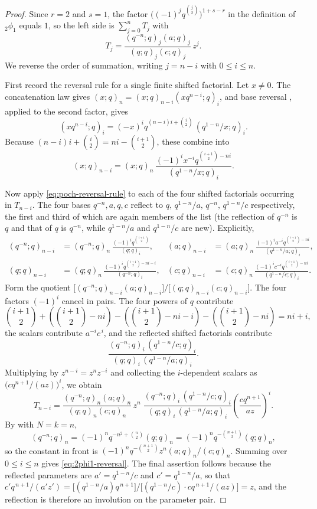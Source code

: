 \documentclass[11pt,a4paper,oneside,openany]{book}
\theoremstyle{definition}
\theoremstyle{remark}
\begin{document}
\begin{proof}
Since $r=2$ and $s=1$, the factor $\bigl((-1)^jq^{\binom j2}\bigr)^{1+s-r}$ in the definition of ${}_2\phi_1$ equals $1$, so the left side is $\sum_{j=0}^{n}T_j$ with
\[
 T_j=\frac{(q^{-n};q)_j(a;q)_j}{(q;q)_j(c;q)_j}\,z^{j}.
\]
We reverse the order of summation, writing $j=n-i$ with $0\le i\le n$.

First record the reversal rule for a single finite shifted factorial.  Let $x\ne0$.  The concatenation law  gives $(x;q)_n=(x;q)_{n-i}(xq^{n-i};q)_i$, and base reversal , applied to the second factor, gives
\[
 (xq^{n-i};q)_i=(-x)^iq^{(n-i)i+\binom i2}\,(q^{1-n}/x;q)_i .
\]
Because $(n-i)i+\binom i2=ni-\binom{i+1}{2}$, these combine into
\begin{equation}
 (x;q)_{n-i}=(x;q)_n\,
 \frac{(-1)^i x^{-i}q^{\binom{i+1}{2}-ni}}{(q^{1-n}/x;q)_i}.
 \label{eq:poch-reversal-rule}
\end{equation}

Now apply \eqref{eq:poch-reversal-rule} to each of the four shifted factorials occurring in $T_{n-i}$.  The four bases $q^{-n},a,q,c$ reflect to $q,\,q^{1-n}/a,\,q^{-n},\,q^{1-n}/c$ respectively, the first and third of which are again members of the list (the reflection of $q^{-n}$ is $q$ and that of $q$ is $q^{-n}$, while $q^{1-n}/a$ and $q^{1-n}/c$ are new).  Explicitly,
\begin{align*}
 (q^{-n};q)_{n-i}&=(q^{-n};q)_n\,
 \frac{(-1)^iq^{\binom{i+1}{2}}}{(q;q)_i},
 &
 (a;q)_{n-i}&=(a;q)_n\,
 \frac{(-1)^ia^{-i}q^{\binom{i+1}{2}-ni}}{(q^{1-n}/a;q)_i},\\
 (q;q)_{n-i}&=(q;q)_n\,
 \frac{(-1)^iq^{\binom{i+1}{2}-ni-i}}{(q^{-n};q)_i},
 &
 (c;q)_{n-i}&=(c;q)_n\,
 \frac{(-1)^ic^{-i}q^{\binom{i+1}{2}-ni}}{(q^{1-n}/c;q)_i}.
\end{align*}
Form the quotient $\bigl[(q^{-n};q)_{n-i}(a;q)_{n-i}\bigr]\big/\bigl[(q;q)_{n-i}(c;q)_{n-i}\bigr]$.  The four factors $(-1)^i$ cancel in pairs.  The four powers of $q$ contribute
\[
 \binom{i+1}{2}
 +\left(\binom{i+1}{2}-ni\right)
 -\left(\binom{i+1}{2}-ni-i\right)
 -\left(\binom{i+1}{2}-ni\right)
 =ni+i,
\]
the scalars contribute $a^{-i}c^{\,i}$, and the reflected shifted factorials
contribute
\[
 \frac{(q^{-n};q)_i\,(q^{1-n}/c;q)_i}{(q;q)_i\,(q^{1-n}/a;q)_i}.
\]
Multiplying by $z^{n-i}=z^{n}z^{-i}$ and collecting the $i$-dependent
scalars as $\bigl(cq^{n+1}/(az)\bigr)^{i}$, we obtain
\[
 T_{n-i}
 =\frac{(q^{-n};q)_n(a;q)_n}{(q;q)_n(c;q)_n}\,z^{n}\;
 \frac{(q^{-n};q)_i\,(q^{1-n}/c;q)_i}
 {(q;q)_i\,(q^{1-n}/a;q)_i}
 \left(\frac{cq^{n+1}}{az}\right)^{i}.
\]
By  with $N=k=n$,
\[
 (q^{-n};q)_n=(-1)^nq^{-n^2+\binom n2}(q;q)_n
 =(-1)^nq^{-\binom{n+1}{2}}(q;q)_n,
\]
so the constant in front is $(-1)^nq^{-\binom{n+1}{2}}z^{n}(a;q)_n/(c;q)_n$.  Summing over $0\le i\le n$ gives \eqref{eq:2phi1-reversal}.  The final assertion follows because the reflected parameters are $a'=q^{1-n}/c$ and $c'=q^{1-n}/a$, so that $c'q^{\,n+1}/(a'z')=\bigl[(q^{1-n}/a)q^{\,n+1}\bigr]\big/\bigl[(q^{1-n}/c)\cdot cq^{\,n+1}/(az)\bigr]=z$, and the reflection is therefore an involution on the parameter pair.
\end{proof}
\end{document}
